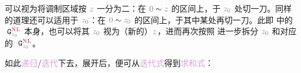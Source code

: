  可以视为将\textcolor{NavyBlue}{调制区域}按 $\mathcolor{gray}{z}$ 一分为二：在 $\mathcolor{gray}{0} \sim \mathcolor{gray}{z}$ 的区间上，于 $\mathcolor{gray}{z_0}$ 处切一刀。同样的道理还可以适用于 $\mathcolor{gray}{z_0}$：在 $\mathcolor{gray}{0} \sim \mathcolor{gray}{z_0}$ 的区间上，于其中某处再切一刀。此即  中的 $\xint{\mathcolor{gray}{-}}{16}{\mathtt{G}}^{\text{\textcolor{Maroon}{NL}}}_{\mathcolor{gray}{z_0}}$ 本身，也可以将其 $\mathcolor{gray}{z_0}$ 视为（新的）$\mathcolor{gray}{z}$，进而再次按照  进一步拆分 $\mathcolor{gray}{z_0}$ 和对应的 $\xint{\mathcolor{gray}{-}}{16}{\mathtt{G}}^{\text{\textcolor{Maroon}{NL}}}_{\mathcolor{gray}{z_0}}$。

如此\textcolor{Plum}{递归}/\textcolor{Plum}{迭代}下去，展开后，便可从\textcolor{Plum}{迭代式}得到\textcolor{Plum}{求和式}：
